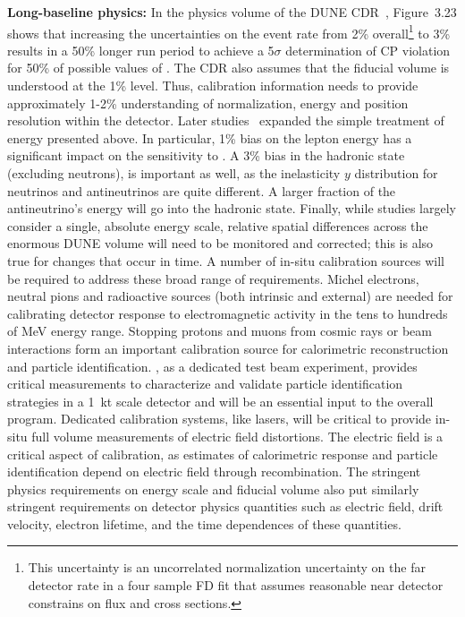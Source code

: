 \textbf{Long-baseline physics:} In the physics volume of the DUNE CDR~\cite{Acciarri:2015uup}, Figure~3.23 shows that increasing the uncertainties on the \nue event rate from \num{2}\% overall\footnote{This uncertainty is an uncorrelated normalization uncertainty on the far detector \nue rate in a four sample FD fit that assumes reasonable near detector constrains on flux and cross sections.} to \num{3}\% results in a \num{50}\% longer run period to achieve a 5$\sigma$ determination of CP violation for 50\% of possible values of . The CDR also assumes that the fiducial volume is understood at the 1\% level. Thus, calibration information needs to provide approximately 1-2\% understanding of normalization, energy and position resolution within the detector. Later studies~\cite{ebias} expanded the simple treatment of energy  presented above. In particular, \num{1}\% bias on the lepton energy has a significant impact on the sensitivity to . A \num{3}\% bias in the hadronic state (excluding neutrons), is important as well, as the inelasticity $y$ distribution for neutrinos and antineutrinos are quite different.  A larger fraction of the antineutrino's energy will go into the hadronic state. Finally, while studies largely consider a single, absolute energy scale, relative spatial differences across the enormous DUNE  volume will need to be monitored and corrected; this is also true for changes that occur in time. A number of in-situ calibration sources will be required to address these broad range of requirements. Michel electrons, neutral pions and radioactive sources (both intrinsic and external) are needed for calibrating detector response to electromagnetic activity in the tens to hundreds of MeV energy range. Stopping protons and muons from cosmic rays or beam interactions form an important calibration source for calorimetric reconstruction and particle identification. , as a dedicated test beam experiment, provides critical measurements to characterize and validate particle identification strategies in a 1~kt scale detector and will be an essential input to the overall program. Dedicated calibration systems, like lasers, will be critical to provide in-situ full volume measurements of electric field distortions. The electric field is a critical aspect of calibration, as  estimates of calorimetric response and particle identification depend on electric field through recombination. The stringent physics requirements on energy scale and fiducial volume also put similarly stringent requirements on detector physics quantities such as electric field, drift velocity, electron lifetime, and the time dependences of these quantities.

